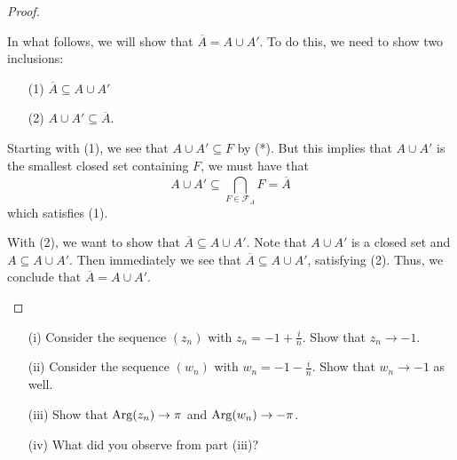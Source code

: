 \documentclass[a4paper]{article}
\begin{document}
\begin{proof}
\begin{enumerate}
    In what follows, we will show that \( \overline{A} = A \cup A' \). To do this, we need to show two inclusions:
    \begin{enumerate}
        \item[(1)] \( \overline{A} \subseteq  A \cup A'  \)
        \item[(2)] \( A \cup A'  \subseteq \overline{A}\).
    \end{enumerate}
    Starting with (1), we see that \( A \cup A'  \subseteq F \) by (*). But this implies that \( A \cup A' \) is the smallest closed set containing \( F  \), we must have that 
    \[  A \cup A' \subseteq  \bigcap_{ F \in {\mathcal{F}}_{A} }^{  }  F = \overline{A} \]
    which satisfies (1).
    
    With (2), we want to show that \( \overline{A} \subseteq A \cup A' \). Note that \( A \cup A' \) is a closed set and \( A \subseteq  A \cup A' \). Then immediately we see that \( \overline{A} \subseteq A \cup A' \), satisfying (2). Thus, we conclude that \( \overline{A} = A \cup A' \).
\end{enumerate}
\end{proof}

\begin{problem}
   \begin{enumerate}
       \item[(i)] Consider the sequence \( ({z}_{n}) \) with \( {z}_{n} = -1 + \frac{ i }{ n }  \). Show that \( {z}_{n} \to -1 \).
       \item[(ii)] Consider the sequence \( ({w}_{n}) \) with \( {w}_{n} = - 1 - \frac{ i }{ n }  \). Show that \( {w}_{n} \to -1  \) as well.
       \item[(iii)] Show that \( \operatorname{Arg}({z}_{n})  \to \pi \) and \( \operatorname{Arg}({w}_{n}) \to - \pi \). 
        \item[(iv)] What did you observe from part (iii)?
   \end{enumerate} 
\end{problem}
\end{document}
